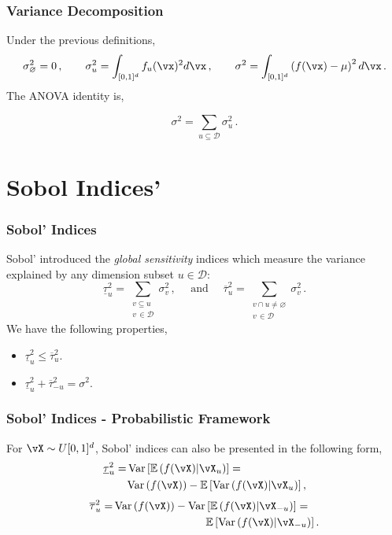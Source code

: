 \documentclass[11pt,compress]{beamer} %
\DeclareMathOperator{\Var}{Var}
\begin{document}
\begin{frame}
\frametitle{Variance Decomposition}
Under the previous definitions,
\begin{equation*}
\sigma^2_{\varnothing} = 0\, ,\qquad \sigma^2_{u} =\int_{[0,1]^{d}} f_u(\vx)^2 d{\vx}\, ,\qquad \sigma^2 =\int_{[0,1]^{d}} \left(f(\vx)-\mu\right)^2 d{\vx}\, .
\end{equation*}
The ANOVA identity is,

\[
\sigma^2 = \sum \limits_{u \subseteq\mathcal{D}} \sigma_u^2 \, .
\]
\end{frame}

\section{Sobol Indices'}

\begin{frame}
\frametitle{Sobol' Indices}
Sobol' introduced the \emph{global sensitivity} indices which measure the variance explained by any dimension subset $u\in\mathcal{D}$:
\begin{equation*}
\underline{\tau}_u^2 = \sum_{\substack{v \subseteq u \\ v\,\in\mathcal{D}}} \sigma_v^2\, , \quad \text{ and } \quad \overline{\tau}_u^2 = \sum_{\substack{v \cap u\neq\varnothing \\ v\,\in\mathcal{D}}} \sigma_v^2\, .
\end{equation*}
We have the following properties,
\begin{itemize}
\item $\underline{\tau}_u^2\leq \overline{\tau}_u^2$.
\item $\underline{\tau}_u^2 + \overline{\tau}_{-u}^2 =\sigma^2$.
\end{itemize}
\end{frame}

\begin{frame}
\frametitle{Sobol' Indices - Probabilistic Framework}
For $\vX\sim U[0,1]^d$, Sobol' indices can also be presented in the following form,
\begin{align*}
\underline{\tau}_u^2 = & \Var \left[ \mathbb{E} \left(f({\vX})|{\vX}_{u}\right)\right] = & \\
& & \hspace{-4cm} \Var\left(f({\vX})\right)-\mathbb{E}\left[ \Var \left(f({\vX})|\vX_u\right)\right],
\end{align*}
\begin{align*}
\overline{\tau}_u^2 = & \Var\left(f({\vX})\right)-\Var \left[ \mathbb{E} \left(f({\vX})|\vX_{-u}\right)\right]   = & \\
& & \hspace{-4cm} \mathbb{E}\left[ \Var \left(f({\vX})|{\vX}_{-u}\right)\right].
\end{align*}
\end{frame}
\end{document}
